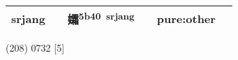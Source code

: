 \documentclass[14pt,a4paper]{scrartcl}
\begin{document}
\begin{longtable}[c]{@{}llllll@{}}
\begin{minipage}[t]{0.14\columnwidth}\raggedright\strut
srjang
\strut\end{minipage} &
\begin{minipage}[t]{0.14\columnwidth}\raggedright\strut
\strut\end{minipage} &
\begin{minipage}[t]{0.14\columnwidth}\raggedright\strut
孀\textsuperscript{5b40~srjang}
\strut\end{minipage} &
\begin{minipage}[t]{0.14\columnwidth}\raggedright\strut
\strut\end{minipage} &
\begin{minipage}[t]{0.14\columnwidth}\raggedright\strut
pure:other
\strut\end{minipage}\tabularnewline
\bottomrule
\end{longtable}

(208) 0732 {[}5{]}
\end{document}
